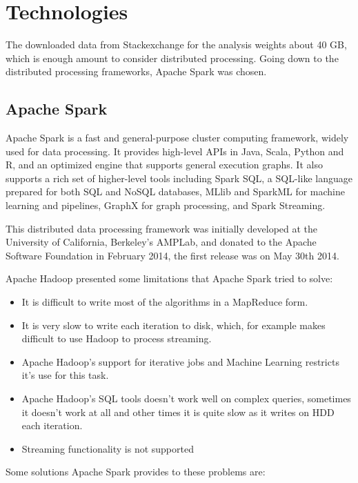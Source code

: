 \documentclass[11pt]{book} %
\begin{document}
\newpage

\chapter{Technologies}
  \label{sec:technologies}

  The downloaded data from Stackexchange for the analysis weights about 40 GB, which is enough amount to consider distributed processing. Going down to the distributed processing frameworks, Apache Spark was chosen.

  \section{Apache Spark}

    Apache Spark is a fast and general-purpose cluster computing framework, widely used for data processing. It provides high-level APIs in Java, Scala, Python and R, and an optimized engine that supports general execution graphs. It also supports a rich set of higher-level tools including Spark SQL, a SQL-like language prepared for both SQL and NoSQL databases, MLlib and SparkML for machine learning and pipelines, GraphX for graph processing, and Spark Streaming.

    This distributed data processing framework was initially developed at the University of California, Berkeley's AMPLab, and donated to the Apache Software Foundation in February 2014, the first release was on May 30th 2014.

    Apache Hadoop presented some limitations that Apache Spark tried to solve:

    \begin{itemize}
      \item It is difficult to write most of the algorithms in a MapReduce form.
      \item It is very slow to write each iteration to disk, which, for example makes difficult to use Hadoop to process streaming.
      \item Apache Hadoop's support for iterative jobs and Machine Learning restricts it's use for this task.
      \item Apache Hadoop's SQL tools doesn't work well on complex queries, sometimes it doesn't work at all and other times it is quite slow as it writes on HDD each iteration.
      \item Streaming functionality is not supported
    \end{itemize}

    Some solutions Apache Spark provides to these problems are:
\end{document}
